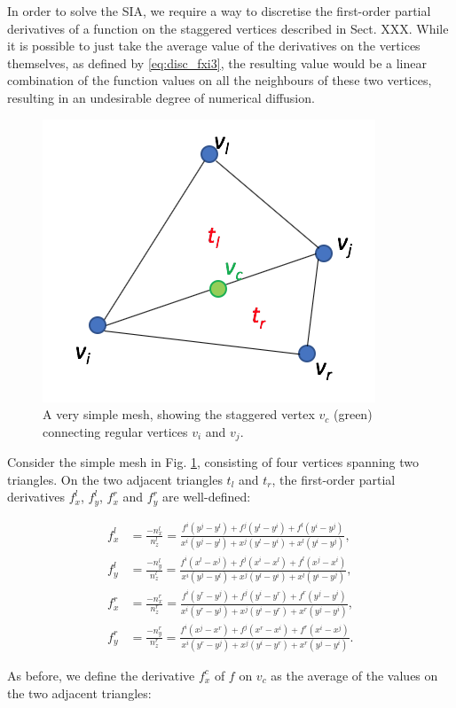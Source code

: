 \documentclass{article}
\begin{document}
In order to solve the SIA, we require a way to discretise the first-order partial derivatives of a function on the staggered vertices described in Sect. XXX. While it is possible to just take the average value of the derivatives on the vertices themselves, as defined by \eqref{eq:disc_fxi3}, the resulting value would be a linear combination of the function values on all the neighbours of these two vertices, resulting in an undesirable degree of numerical diffusion.

\begin{figure}[H] \label{fig:mesh_staggeredvertex}
  \includegraphics[width=0.3\linewidth]{Fig_staggeredvertex.png}
  \caption{A very simple mesh, showing the staggered vertex $v_c$ (green) connecting regular vertices $v_i$ and $v_j$.}
\end{figure}

Consider the simple mesh in Fig. \ref{fig:mesh_staggeredvertex}, consisting of four vertices spanning two triangles. On the two adjacent triangles $t_l$ and $t_r$, the first-order partial derivatives $f_x^l$, $f_y^l$, $f_x^r$ and $f_y^r$ are well-defined:

\begin{align} \label{eq:disc_fxlfyl}
f_x^l &= \frac{ -n_x^l }{ n_z^l } = \frac{ f^i (y^j - y^l) + f^j (y^l - y^i) + f^l (y^i - y^j)}{ x^i (y^j - y^l) + x^j (y^l - y^i) + x^l (y^i - y^j) }, \\
f_y^l &= \frac{ -n_y^l }{ n_z^l } = \frac{ f^i (x^l - x^j) + f^j (x^i - x^l) + f^l (x^j - x^i)}{ x^i (y^j - y^l) + x^j (y^l - y^i) + x^l (y^i - y^j) }, \\
f_x^r &= \frac{ -n_x^r }{ n_z^r } = \frac{ f^i (y^r - y^j) + f^j (y^i - y^r) + f^r (y^j - y^i)}{ x^i (y^r - y^j) + x^j (y^i - y^r) + x^r (y^j - y^i) }, \\
f_y^r &= \frac{ -n_y^r }{ n_z^r } = \frac{ f^i (x^j - x^r) + f^j (x^r - x^i) + f^r (x^i - x^j)}{ x^i (y^r - y^j) + x^j (y^i - y^r) + x^r (y^j - y^i) }.
\end{align}

As before, we define the derivative $f_x^c$ of $f$ on $v_c$ as the average of the values on the two adjacent triangles:
\end{document}
